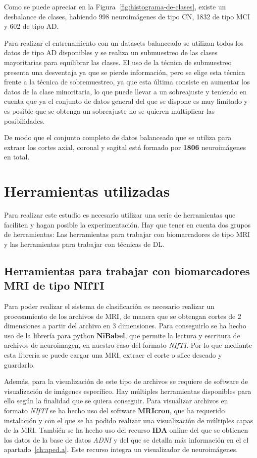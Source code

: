 Como se puede apreciar en la Figura~\ref{fig:histograma-de-clases}, existe un desbalance de clases, habiendo 998
neuroimágenes de tipo CN, 1832 de tipo MCI y 602 de tipo AD.

Para realizar el entrenamiento con un datasets balanceado se utilizan todos los datos de tipo AD disponibles y se
realiza un submuestreo de las clases mayoritarias para equilibrar las clases.
El uso de la técnica de submuestreo presenta una desventaja ya que se pierde información, pero se elige esta técnica
frente a la técnica de sobremuestreo, ya que esta última consiste en aumentar los datos de la clase minoritaria, lo
que puede llevar a un sobreajuste y teniendo en cuenta que ya el conjunto de datos general del que se dispone es muy
limitado y es posible que se obtenga un sobreajuste no se quieren multiplicar las posibilidades.

De modo que el conjunto completo de datos balanceado que se utiliza para extraer los cortes axial, coronal y sagital
está formado por \textbf{1806} neuroimágenes en total.

\section{Herramientas utilizadas}\label{sec:herramientas-utilizadas}
Para realizar este estudio es necesario utilizar una serie de herramientas que faciliten y hagan posible la 
experimentación.
Hay que tener en cuenta dos grupos de herramientas: Las herramientas para trabajar con biomarcadores de tipo MRI y las 
herramientas para trabajar con técnicas de DL.

\subsection{Herramientas para trabajar con biomarcadores MRI de tipo NIfTI}
\label{subsec:herramientas-para-trabajar-con-biomarcadores-mri-de-tipo-nifti}
Para poder realizar el sistema de clasificación es necesario realizar un procesamiento de los archivos de MRI, de 
manera que se obtengan cortes de 2 dimensiones a partir del archivo en 3 dimensiones.
Para conseguirlo se ha hecho uso de la librería para python \textbf{NiBabel}, que permite la lectura y escritura  de 
archivos de neuroimagen, en nuestro caso del formato \textit{NIfTI}.
Por lo que mediante esta librería se puede cargar una MRI, extraer el corte o slice deseado y guardarlo.

Además, para la visualización de este tipo de archivos se requiere de software de visualización de imágenes específico.
Hay múltiples herramientas disponibles para ello según la finalidad que se quiera conseguir.
Para visualizar archivos en formato \textit{NIfTI} se ha hecho uso del software \textbf{MRIcron}, que ha requerido 
instalación y con el que se ha podido realizar una visualización de múltiples capas de la MRI. También se ha hecho uso 
del recurso \textbf{IDA} online del que se obtienen los datos de la base de datos \textit{ADNI} y del que se detalla más
información en el el apartado~\ref{ch:aped.a}.
Este recurso integra un visualizador de neuroimágenes.


